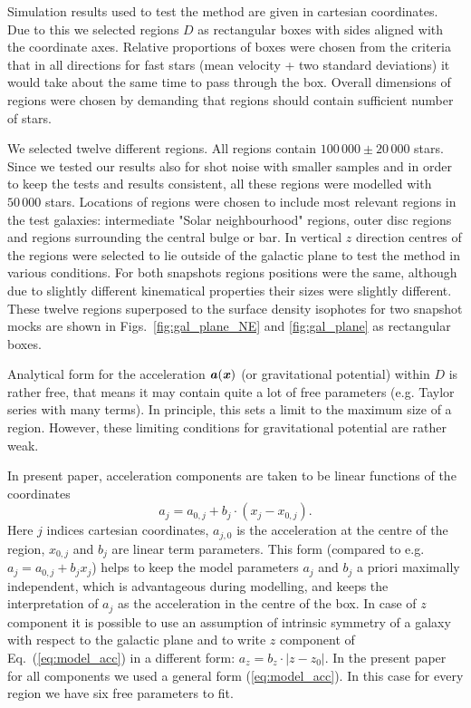 \documentclass[fleqn,usenatbib]{mnras}
\begin{document}
Simulation results used to test the method are given in cartesian coordinates. Due to this we selected regions $D$ as rectangular boxes with sides aligned with the coordinate axes. Relative proportions of  boxes were chosen from the criteria that in all directions for fast stars (mean velocity + two standard deviations) it would take about the same time to pass through the box. Overall dimensions of regions were chosen by demanding that regions should contain sufficient number of stars.

We selected twelve different regions. All regions contain $100\,000 \pm 20\,000$ stars. Since we tested our results also for shot noise with smaller samples and in order to keep the tests and results consistent, all these regions were modelled with $50\,000$ stars. Locations of regions were chosen to include most relevant regions in the test galaxies: intermediate "Solar neighbourhood" regions, outer disc regions and regions surrounding the central bulge or bar. In vertical $z$ direction centres of the regions were selected to lie outside of the galactic plane to  test the method in various conditions. For both snapshots regions positions were the same, although due to slightly different kinematical properties their sizes were slightly different. These twelve regions superposed to the surface density isophotes for two snapshot mocks are shown in Figs.~\ref{fig:gal_plane_NE} and \ref{fig:gal_plane} as rectangular boxes.

Analytical form for the acceleration $\textbf{\textit{a}}(\textbf{\textit{x}})$ (or gravitational potential) within $D$ is rather free, that means it may contain quite a lot of free parameters (e.g. Taylor series with many terms). In principle, this sets a limit to the maximum size of a region. However, these limiting conditions for gravitational potential are rather weak.

In present paper, acceleration components are taken to be linear functions of the coordinates
\begin{equation}
	a_j = a_{0,j} + b_{j}\cdot(x_j - x_{\mathrm{0},j}). \label{eq:model_acc}
\end{equation}
Here $j$ indices cartesian coordinates, $a_{j,0}$ is the acceleration at the centre of the region, $x_{\mathrm{0},j}$ and $b_j$ are linear term parameters. This form (compared to e.g. $a_j = a_{0,j}+b_jx_j$) helps to keep the model parameters $a_j$ and $b_j$ a priori maximally independent, which is advantageous during modelling, and keeps the interpretation of $a_j$ as the acceleration in the centre of the box. 
In case of $z$ component it is possible to use an assumption of intrinsic symmetry of a galaxy with respect to the galactic plane and to write $z$ component of Eq.~(\ref{eq:model_acc}) in a different form: $a_z = b_z\cdot |z - z_0|$. In the present paper for all components we used a general form (\ref{eq:model_acc}). In this case for every region we have six free parameters to fit. 
\end{document}
